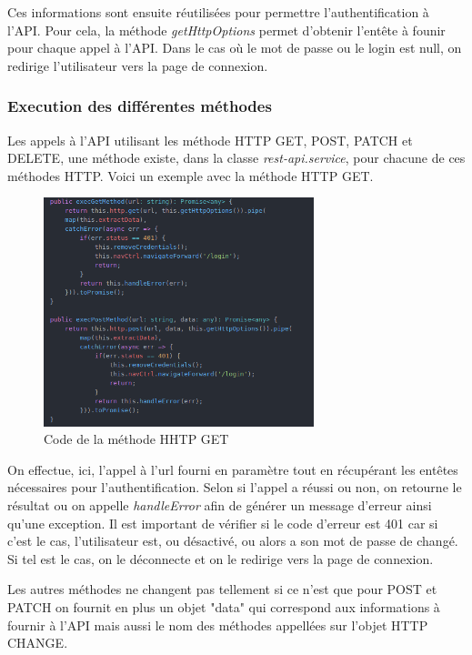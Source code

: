 				\noindent
				Ces informations sont ensuite réutilisées pour permettre l'authentification à l'API. Pour cela, la méthode \textit{getHttpOptions} permet d'obtenir l'entête à founir pour chaque appel à l'API. Dans le cas où le mot de passe ou le login est null, on redirige l'utilisateur vers la page de connexion.

			\subsubsection{Execution des différentes méthodes}

				Les appels à l'API utilisant les méthode HTTP GET, POST, PATCH et DELETE, une méthode existe, dans la classe \textit{rest-api.service}, pour chacune de ces méthodes HTTP. Voici un exemple avec la méthode HTTP GET.

				\begin{figure}[H]
					\centering\includegraphics[width=0.70\textwidth, keepaspectratio]{res/ionic-rest-execmethod.png}
					\caption{Code de la méthode HHTP GET}
				\end{figure}

				\noindent
				On effectue, ici, l'appel à l'url fourni en paramètre tout en récupérant les entêtes nécessaires pour l'authentification. Selon si l'appel a réussi ou non, on retourne le résultat ou on appelle \textit{handleError} afin de générer un message d'erreur ainsi qu'une exception. Il est important de vérifier si le code d'erreur est 401 car si c'est le cas, l'utilisateur est, ou désactivé, ou alors a son mot de passe de changé. Si tel est le cas, on le déconnecte et on le redirige vers la page de connexion.

				\noindent
				Les autres méthodes ne changent pas tellement si ce n'est que pour POST et PATCH on fournit en plus un objet "data" qui correspond aux informations à fournir à l'API mais aussi le nom des méthodes appellées sur l'objet HTTP CHANGE.

